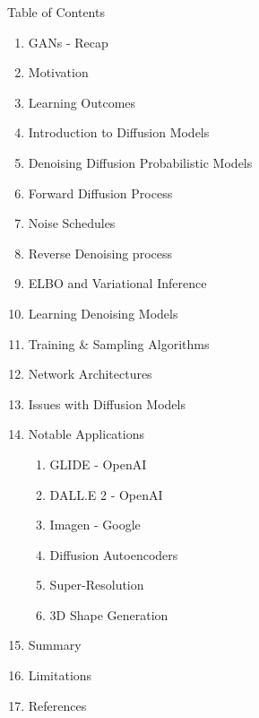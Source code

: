 \begin{frame}[allowframebreaks]{Table of Contents}
\begin{enumerate}
    \item GANs - Recap
    \item Motivation
    \item Learning Outcomes
    \item Introduction to Diffusion Models
    \item Denoising Diffusion Probabilistic Models
    \item Forward Diffusion Process
    \item Noise Schedules
    \item Reverse Denoising process
    \item ELBO and Variational Inference
    \item Learning Denoising Models
    \item Training & Sampling Algorithms
    \item Network Architectures
    \item Issues with Diffusion Models
    \item Notable Applications
    \begin{enumerate}
        \item GLIDE - OpenAI
        \item DALL.E 2 - OpenAI
        \item Imagen - Google
        \item Diffusion Autoencoders
        \item Super-Resolution
        \item 3D Shape Generation
    \end{enumerate}
    \item Summary
    \item Limitations
    \item References
\end{enumerate}
\end{frame}